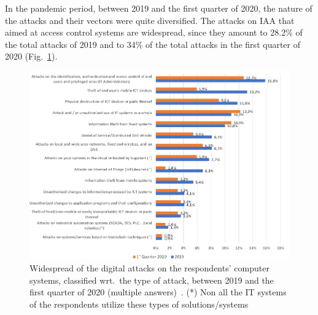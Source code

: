 \documentclass{easychair}
\begin{document}
In the pandemic period, between 2019 and the first quarter of 2020, the nature of the attacks and their vectors were quite diversified.
The attacks on IAA that aimed at access control systems are widespread, since they amount to 28.2\% of the total attacks
of 2019 and to 34\% of the total attacks in the first quarter of 2020 (Fig.~\ref{fig:5}).

\begin{figure}
  \centering
  \includegraphics[width=1\textwidth]{pictures/fig5.png}
  \caption{Widespread of the digital attacks on the respondents' computer systems, classified wrt.\ the type of attack, between 2019 and the first quarter of 2020 (multiple answers)~\cite{oad20}. (*) Non all the IT systems of the respondents utilize these types of solutions/systems}
  \label{fig:5}
\end{figure}
\end{document}
